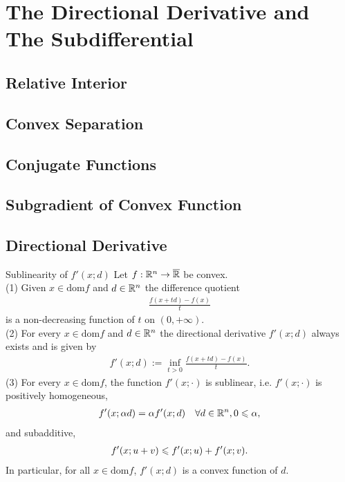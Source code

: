 \chapter{The Directional Derivative and The Subdifferential}


\section{Relative Interior}

\section{Convex Separation}

\section{Conjugate Functions}

\section{Subgradient of Convex Function}

\section{Directional Derivative}

\begin{lemma}{Sublinearity of $f'(x;d)$}{}
    Let $f:\mathbb{R}^n\rightarrow \overline{\mathbb{R}}$ be convex.\\
    (1) Given $x\in \text{dom}f$ and $d\in \mathbb{R}^n$ the difference quotient
    \begin{align*}
        \frac{f(x+td)-f(x)}{t}
    \end{align*}
    is a non-decreasing function of $t$ on $(0,+\infty)$.\\
    (2) For every $x\in\text{dom}f$ and $d\in \mathbb{R}^n$ the directional derivative $f'(x;d)$ always exists and is given by 
    \begin{align*}
        f'(x;d):=\inf_{t>0} \frac{f(x+td)-f(x)}{t}.
    \end{align*} 
    (3) For every $x\in \text{dom}f$, the function $f'(x;\cdot)$ is sublinear, i.e. $f'(x;\cdot)$ is positively homogeneous,
    \begin{align*}
        f'(x;\alpha d)=\alpha f'(x;d) \quad \forall d\in \mathbb{R}^n,0\leqslant \alpha,
    \end{align*}
    and subadditive,
    \begin{align*}
        f'(x;u+v)\leqslant f'(x;u)+f'(x;v).
    \end{align*}
    In particular, for all $x\in \text{dom}f$, $f'(x;d)$ is a convex function of $d$.
\end{lemma}

